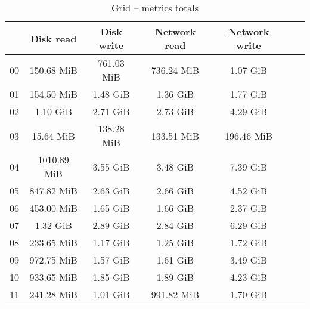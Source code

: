 \begin{table}[H]
\begin{center}
\caption{Grid -- metrics totals}
\label{tab:grid-total}
\begin{tabular}{|c|c|c|c|c|c|c|}
\hline
   & Disk read & Disk write & Network read & Network write\\
\hline
00 & 150.68 MiB & 761.03 MiB & 736.24 MiB & 1.07 GiB\\
01 & 154.50 MiB & 1.48 GiB & 1.36 GiB & 1.77 GiB\\
02 & 1.10 GiB & 2.71 GiB & 2.73 GiB & 4.29 GiB\\
03 & 15.64 MiB & 138.28 MiB & 133.51 MiB & 196.46 MiB\\
04 & 1010.89 MiB & 3.55 GiB & 3.48 GiB & 7.39 GiB\\
05 & 847.82 MiB & 2.63 GiB & 2.66 GiB & 4.52 GiB\\
06 & 453.00 MiB & 1.65 GiB & 1.66 GiB & 2.37 GiB\\
07 & 1.32 GiB & 2.89 GiB & 2.84 GiB & 6.29 GiB\\
08 & 233.65 MiB & 1.17 GiB & 1.25 GiB & 1.72 GiB\\
09 & 972.75 MiB & 1.57 GiB & 1.61 GiB & 3.49 GiB\\
10 & 933.65 MiB & 1.85 GiB & 1.89 GiB & 4.23 GiB\\
11 & 241.28 MiB & 1.01 GiB & 991.82 MiB & 1.70 GiB\\
\hline
\end{tabular}
\end{center}
\end{table}
